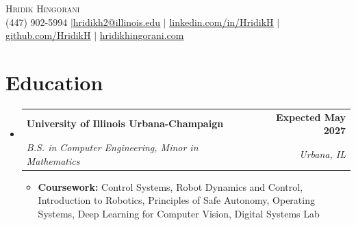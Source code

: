 \documentclass[letterpaper,11pt]{article}
\makeatletter
\newcommand{\ulink}[2]{\href{#1}{\underline{#2}}}
\newcommand{\resumeItem}[1]{\item{\fontsize{9.5pt}{11.2pt}\selectfont #1\par}\vspace{-1pt}}
\newcommand{\resumeSubheading}[4]{
  \vspace{-2pt}\item
    \begin{tabular*}{\textwidth}[t]{l@{\extracolsep{\fill}}r}
      \textbf{#1} & \textbf{#2} \\
      \textit{\small#3} & \textit{\small #4} \\
    \end{tabular*}\vspace{-7pt}
}
\newcommand{\resumeSubHeadingListStart}{\begin{itemize}[leftmargin=0in, label={}]}
\newcommand{\resumeSubHeadingListEnd}{\end{itemize}}
\newcommand{\resumeItemListStart}{\begin{itemize}[leftmargin=0.32in, label=\textbullet, itemsep=0pt, topsep=2pt]}
\newcommand{\resumeItemListEnd}{\end{itemize}\vspace{-5pt}}
\makeatother
\begin{document}
\begin{center}
    {\Huge \scshape Hridik Hingorani} \\ \vspace{3pt}
    \small (447) 902-5994 \enspace$|$\enspace \ulink{mailto:hridikh2@illinois.edu}{hridikh2@illinois.edu} \enspace$|$\enspace
    \ulink{https://linkedin.com/in/HridikH}{linkedin.com/in/HridikH} \enspace$|$\enspace
    \ulink{https://github.com/HridikH}{github.com/HridikH} \enspace$|$\enspace
    \ulink{https://hridikhingorani.com}{hridikhingorani.com}
\end{center}
\vspace{-12pt}

\section{Education}
  \resumeSubHeadingListStart
    \resumeSubheading
      {University of Illinois Urbana-Champaign}{Expected May 2027}
      {B.S. in Computer Engineering, Minor in Mathematics}{Urbana, IL}
      \resumeItemListStart
        \resumeItem{\textbf{Coursework:} Control Systems, Robot Dynamics and Control, Introduction to Robotics, Principles of Safe Autonomy, Operating Systems, Deep Learning for Computer Vision, Digital Systems Lab}
      \resumeItemListEnd
  \resumeSubHeadingListEnd

\end{document}
